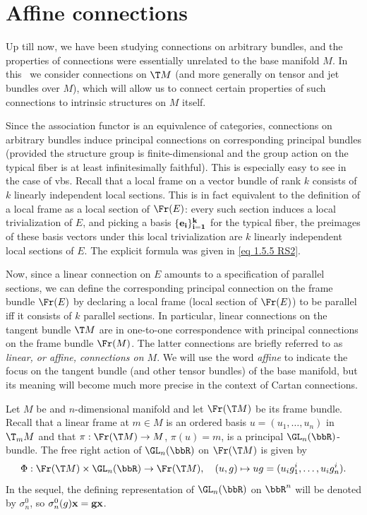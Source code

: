 \section{Affine connections}

Up till now, we have been studying connections on arbitrary bundles, and the properties of connections were essentially unrelated to the base manifold $M$. In this \sect\ we consider connections on $\T M$ (and more generally on tensor and jet bundles over $M$), which will allow us to connect certain properties of such connections to intrinsic structures on $M$ itself.

Since the association functor is an equivalence of categories, connections on arbitrary bundles induce principal connections on corresponding principal bundles (provided the structure group is finite-dimensional and the group action on the typical fiber is at least infinitesimally faithful). This is especially easy to see in the case of \glspl{vb}. Recall that a local frame on a vector bundle of rank $k$ consists of $k$ linearly independent local sections. This is in fact equivalent to the definition of a local frame as a local section of $\Fr(E)$: every such section induces a local trivialization of $E$, and picking a basis $\{\bf{e}_i\}_{i=1}^k$ for the typical fiber, the preimages of these basis vectors under this local trivialization are $k$ linearly independent local sections of $E$. The explicit formula was given in \eqref{eq 1.5.5 RS2}.

Now, since a linear connection on $E$ amounts to a specification of parallel sections, we can define the corresponding principal connection on the frame bundle $\Fr(E)$ by declaring a local frame (local section of $\Fr(E)$) to be parallel iff it consists of $k$ parallel sections. In particular, linear connections on the tangent bundle $\T M$ are in one-to-one correspondence with principal connections on the frame bundle $\Fr(M)$. The latter connections are briefly referred to as \emph{linear, or affine, connections on $M$}. We will use the word \emph{affine} to indicate the focus on the tangent bundle (and other tensor bundles) of the base manifold, but its meaning will become much more precise in the context of Cartan connections.

Let $M$ be and $n$-dimensional manifold and let $\Fr(\T M)$ be its frame bundle. Recall that a linear frame at $m\in M$ is an ordered basis $u=(u_1,\ldots,u_n)$ in $\T_m M$ and that $\pi:\Fr(\T M)\to M$, $\pi(u)=m$, is a principal $\GL_n(\bbR)$-bundle. The free right action of $\GL_n(\bbR)$ on $\Fr(\T M)$ is given by
\[\Phi:\Fr(\T M)\times \GL_n(\bbR)\to \Fr(\T M),\quad (u,g)\mapsto ug=(u_ig^i_1,\ldots,u_ig^i_n).\]
In the sequel, the defining representation of $\GL_n(\bbR)$ on $\bbR^n$ will be denoted by $\sigma^0_n$, so $\sigma^0_n(g)\bf{x}=g\bf{x}$.


